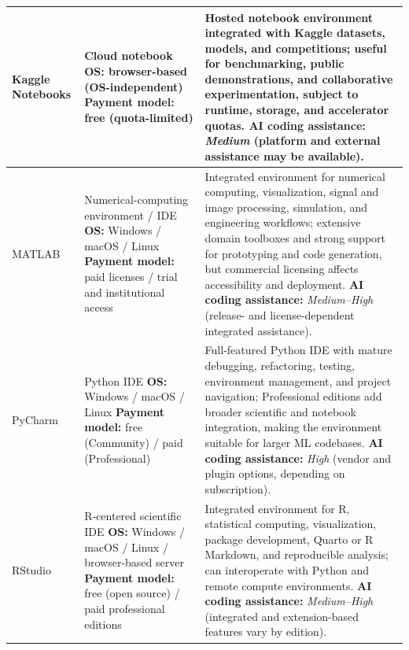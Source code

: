 \documentclass{article}
\newcounter{entry}[section]
\renewcommand{\theentry}{\thesection.\arabic{entry}}
\newcommand{\EntryRow}[5]{
    \noalign{
        \stepcounter{entry}
        \xdef\ENTRYNUM{\theentry}
        \phantomsection\label{entry:#1}
        \addcontentsline{toc}{subsubsection}{\ENTRYNUM\hspace{0.5cm}#2}
    }
    #2 #3 & #4 & #5 \\
    \hline
}
\begin{document}
\begin{longtable}{|p{}|p{}|p{}|}
    \EntryRow{kaggle_notebooks}{Kaggle Notebooks}{\cite{preda2023developing}}{Cloud notebook \newline \textbf{OS:} browser-based (OS-independent) \newline \textbf{Payment model:} free (quota-limited)}{Hosted notebook environment integrated with Kaggle datasets, models, and competitions; useful for benchmarking, public demonstrations, and collaborative experimentation, subject to runtime, storage, and accelerator quotas. \newline \textbf{AI coding assistance:} \textit{Medium} (platform and external assistance may be available).}

    \EntryRow{matlab}{MATLAB}{\cite{mathworks2026matlab}}{Numerical-computing environment / IDE \newline \textbf{OS:} Windows / macOS / Linux \newline \textbf{Payment model:} paid licenses / trial and institutional access}{Integrated environment for numerical computing, visualization, signal and image processing, simulation, and engineering workflows; extensive domain toolboxes and strong support for prototyping and code generation, but commercial licensing affects accessibility and deployment. \newline \textbf{AI coding assistance:} \textit{Medium--High} (release- and license-dependent integrated assistance).}

    \EntryRow{pycharm}{PyCharm}{\cite{islam2015mastering}}{Python IDE \newline \textbf{OS:} Windows / macOS / Linux \newline \textbf{Payment model:} free (Community) / paid (Professional)}{Full-featured Python IDE with mature debugging, refactoring, testing, environment management, and project navigation; Professional editions add broader scientific and notebook integration, making the environment suitable for larger ML codebases. \newline \textbf{AI coding assistance:} \textit{High} (vendor and plugin options, depending on subscription).}

    \EntryRow{rstudio}{RStudio}{\cite{rstudio2020rstudio}}{R-centered scientific IDE \newline \textbf{OS:} Windows / macOS / Linux / browser-based server \newline \textbf{Payment model:} free (open source) / paid professional editions}{Integrated environment for R, statistical computing, visualization, package development, Quarto or R Markdown, and reproducible analysis; can interoperate with Python and remote compute environments. \newline \textbf{AI coding assistance:} \textit{Medium--High} (integrated and extension-based features vary by edition).}


\end{longtable}
\end{document}
